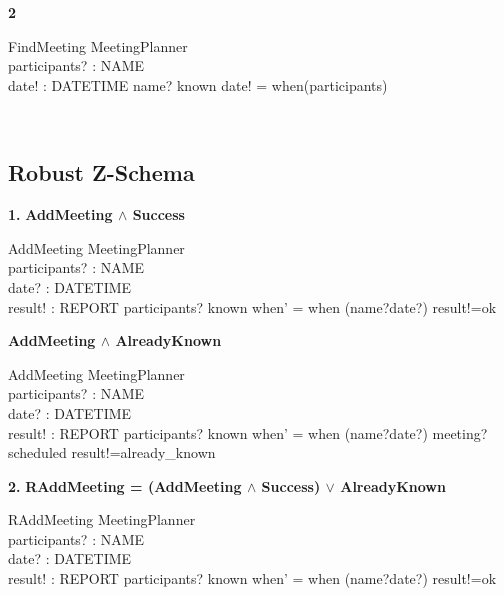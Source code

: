 \documentclass[fuzz]{article}
\begin{document}
\textbf{2}
\begin{schema}{FindMeeting}
\Xi MeetingPlanner \\
participants? : NAME\\
date! : DATETIME
\where
name? \in known
\also
date! = when(participants)
\end{schema} \\[2.0cm]

\subsection{Robust Z-Schema}
\textbf{1.}
\textbf{AddMeeting $\wedge$ Success}
\begin{schema}{AddMeeting}
\Delta MeetingPlanner \\
participants? : NAME \\
date? : DATETIME \\
result! : REPORT
\where
participants? \notin known
\also
when' = when \bigcup (name?\pfun date?)
\also
result!=ok
\end{schema}

\textbf{AddMeeting $\wedge$ AlreadyKnown}
\begin{schema}{AddMeeting}
\Delta MeetingPlanner \\
participants? : NAME \\
date? : DATETIME \\
result! : REPORT
\where
participants? \notin known
\also
when' = when \bigcup (name?\pfun date?)
\also
meeting?  \in scheduled
\also
result!=already_known
\end{schema}

\textbf{2.}
\textbf{RAddMeeting = (AddMeeting $\wedge$ Success) $\lor$ AlreadyKnown}
\begin{schema}{RAddMeeting}
\Delta MeetingPlanner \\
participants? : NAME \\
date? : DATETIME \\
result! : REPORT
\where
participants? \notin known
\also
when' = when \bigcup (name?\pfun date?)
\also
result!=ok
\end{schema}
\end{document}
